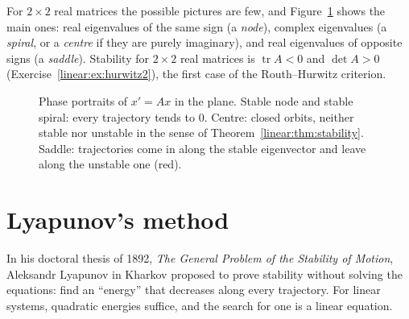For $2\times2$ real matrices the possible pictures are few, and Figure~\ref{linear:fig:phase} shows the main ones: real eigenvalues of the
same sign (a \emph{node}), complex eigenvalues (a \emph{spiral}, or a \emph{centre} if they are purely imaginary), and real eigenvalues
of opposite signs (a \emph{saddle}). Stability for $2\times2$ real matrices is $\operatorname{tr}A<0$ and $\det A>0$
(Exercise~\ref{linear:ex:hurwitz2}), the first case of the Routh--Hurwitz criterion.

\begin{figure}[ht]
\centering
{}
\caption{Phase portraits of $x'=Ax$ in the plane. Stable node and stable spiral: every trajectory tends to $0$. Centre: closed
orbits, neither stable nor unstable in the sense of Theorem~\ref{linear:thm:stability}. Saddle: trajectories come in along the stable
eigenvector and leave along the unstable one (red).}
\label{linear:fig:phase}
\end{figure}

\section{Lyapunov's method}

In his doctoral thesis of 1892, \emph{The General Problem of the Stability of Motion}, Aleksandr Lyapunov in Kharkov proposed to
prove stability without solving the equations: find an ``energy'' that decreases along every trajectory. For linear systems,
quadratic energies suffice, and the search for one is a linear equation.

